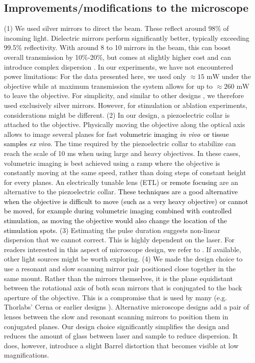\documentclass[10pt,letterpaper]{article}
\newcommand{\invivo}{\textit{in vivo}~}
\begin{document}
\subsection*{Improvements/modifications to the microscope}
(1) We used silver mirrors to direct the beam. These reflect around 98\% of incoming light. Dielectric mirrors perform significantly better, typically exceeding 99.5\% reflectivity. With around 8 to 10 mirrors in the beam, this can boost overall transmission by 10\%-20\%, but comes at slightly higher cost and can introduce complex dispersion \cite{Rupprecht2019}. In our experiments, we have not encountered power limitations: For the data presented here, we used only $\approx 15\text{ mW}$ under the objective while at maximum transmission the system allows for up to $\approx 260\text{ mW}$ to leave the objective. For simplicity, and similar to other designs \cite{Sofroniew2016}, we therefore used exclusively silver mirrors. However, for stimulation or ablation experiments, considerations might be different.\newline
(2) In our design, a piezoelectric collar is attached to the objective. Physically moving the objective along the optical axis allows to image several planes for fast \textcolor{black}{volumetric imaging \invivo or tissue samples \textit{ex vivo}}. The time required by the piezoelectric collar to stabilize can reach the scale of 10 ms when using large and heavy objectives. In these cases, volumetric imaging is best achieved using a ramp where the objective is constantly moving at the same speed, rather than doing steps of constant height for every planes. An electrically tunable lens (ETL) \cite{Chen2016} or \textcolor{black}{remote focusing} \cite{Botcherby2007} are an alternative to the piezoelectric collar. \textcolor{black}{These techniques are a good alternative when the objective is difficult to move (such as a very heavy objective) or cannot be moved, for example during volumetric imaging combined with controlled stimulation, as moving the objective would also change the location of the stimulation spots.}\newline
(3) Estimating the pulse duration suggests non-linear dispersion that we cannot correct. This is highly dependent on the laser. For readers interested in this aspect of microscope design, we refer to \cite{Saidi2023, Bueno2019}. If available, other light sources might be worth exploring.\newline
(4) We made the design choice to use a resonant and slow scanning mirror pair positioned close together in the same mount. Rather than the mirrors themselves, it is the plane equidistant between the rotational axis of both scan mirrors that is conjugated to the back aperture of the objective. This is a compromise that is used by many (e.g. Thorlabs' Cerna or earlier designs \cite{Rosenegger2014, Tan1999, Nguyen2001}). Alternative microscope designs add a pair of lenses between the slow and resonant scanning mirrors to position them in conjugated planes. Our design choice significantly simplifies the design and reduces the amount of glass between laser and sample to reduce dispersion. It does, however, introduce a slight Barrel distortion that becomes visible at low magnifications.\newline
\end{document}

